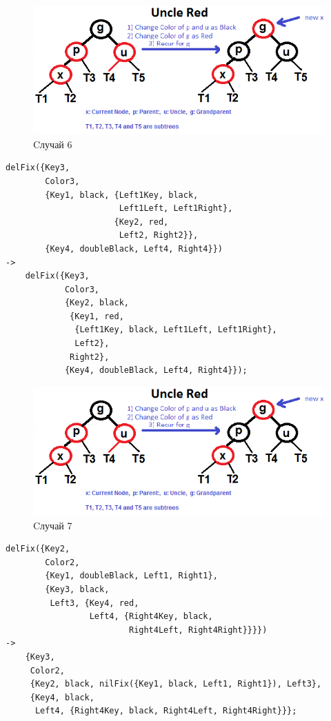 			\begin{figure}[H]
				\centering
				\includegraphics[width=\textwidth]{img/tan-aus.png}
				\caption{Cлучай 6}
			\end{figure}
			\begin{lstlisting}
delFix({Key3,																		
        Color3,																		
        {Key1, black, {Left1Key, black, 
                       Left1Left, Left1Right}, 					
                      {Key2, red, 
                       Left2, Right2}},					
        {Key4, doubleBlack, Left4, Right4}})																			
->																					
    delFix({Key3, 																	
            Color3,																	
            {Key2, black, 
             {Key1, red, 
              {Left1Key, black, Left1Left, Left1Right}, 
              Left2}, 
             Right2},													
            {Key4, doubleBlack, Left4, Right4}});																				
			\end{lstlisting}
			
			\begin{figure}[H]
				\centering
				\includegraphics[width=\textwidth]{img/tan-aus.png}
				\caption{Cлучай 7}
			\end{figure}
			\begin{lstlisting}
delFix({Key2,																		
        Color2,																		
        {Key1, doubleBlack, Left1, Right1},											
        {Key3, black, 
         Left3,	{Key4, red, 
                 Left4, {Right4Key, black, 
                 		 Right4Left, Right4Right}}}})																			
->																					
    {Key3,																			
     Color2,																		
     {Key2, black, nilFix({Key1, black, Left1, Right1}), Left3},															
	 {Key4, black, 
	  Left4, {Right4Key, black, Right4Left, Right4Right}}};																				
			\end{lstlisting}
			
